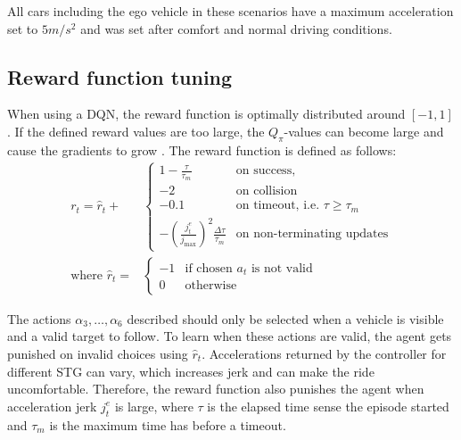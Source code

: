 All cars including the ego vehicle in these scenarios have a maximum acceleration set to $5 m/s^2$ and was set after comfort and normal driving conditions. 

\subsection{Reward function tuning}
When using a DQN, the reward function is optimally distributed around $[-1, 1]$. If the defined reward values are too large, the $Q_\pi$-values can become large and cause the gradients to grow \cite{VanHasseltLearningMagnitude}. 
The reward function is defined as follows:
\begin{align*}
r_t = \hat{r}_t + &\begin{cases}
1 - \frac{\tau}{\tau_m} & \text{on success, }\\
-2                 & \text{on collision}\\
-0.1                & \text{on timeout, i.e. } \tau \ge \tau_m\\
-\left(\frac{j^{e}_t}{j_{\max}}\right)^2\frac{\Delta \tau}{\tau_m}         & \text{on non-terminating updates}
\end{cases} \\
\text{where } \hat{r}_t = &\begin{cases}
-1  & \text{if chosen $a_t$ is not valid}\\
0   & \text{otherwise}
\end{cases}
\end{align*}

\noindent The actions $\alpha_3, \dots, \alpha_6$ described should only be selected when a vehicle is visible and a valid target to follow. To learn when these actions are valid, the agent gets punished on invalid choices using $\hat r_t$. Accelerations returned by the controller for different STG can vary, which increases jerk and can make the ride uncomfortable. Therefore, the reward function also punishes the agent when acceleration jerk $j^{e}_t$ is large, where $\tau$ is the elapsed time sense the episode started and $\tau_m$ is the maximum time has before a timeout. 

